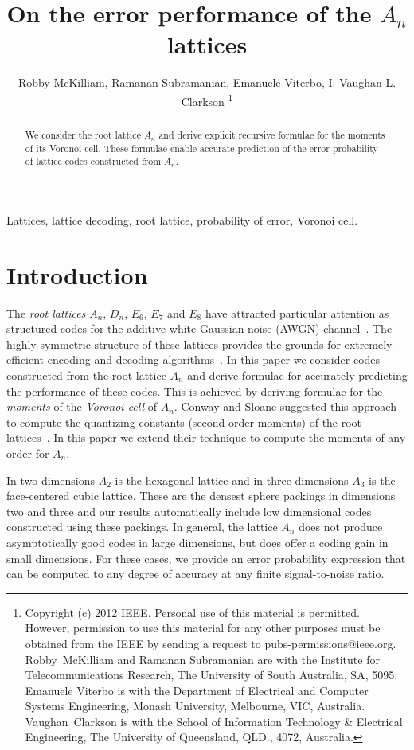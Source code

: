 \documentclass[journal]{IEEEtran}
\title{On the error performance of the $A_n$ lattices}
\author{Robby McKilliam, Ramanan Subramanian, Emanuele Viterbo, I. Vaughan L. Clarkson
 \thanks{Copyright (c) 2012 IEEE. Personal use of this material is permitted.  However, permission to use this material for any other purposes must be obtained from the IEEE by sending a request to pubs-permissions@ieee.org.  Robby~McKilliam and Ramanan Subramanian are with the Institute for Telecommunications Research, The University of South Australia, SA, 5095.  Emanuele Viterbo is with the Department of Electrical and Computer Systems Engineering, Monash University, Melbourne, VIC, Australia.   Vaughan~Clarkson is with the School of Information Technology \& Electrical Engineering, The University of Queensland, QLD., 4072, Australia.}
}
\begin{document}
\newcommand{\calR}{\mathcal{R}}
\newcommand{\hist}{\operatorname{hist}}

\maketitle

\begin{abstract}
We consider the root lattice $A_n$ and derive explicit recursive formulae for the moments of its Voronoi cell.  These formulae
enable accurate prediction of the error probability of lattice codes constructed from $A_n$.
\end{abstract}

\begin{IEEEkeywords}
Lattices, lattice decoding, root lattice, probability of error, Voronoi cell.
\end{IEEEkeywords}

\section{Introduction}\label{sec:introduction}


The \emph{root lattices} $A_n$, $D_n$, $E_6$, $E_7$ and $E_8$ have attracted particular attention as structured codes for the additive white Gaussian noise (AWGN) channel~\cite{SPLAG}. The highly symmetric structure of these lattices provides the grounds for extremely efficient encoding and decoding algorithms~\cite{Conway1982FastQuantDec,McKilliam2009CoxeterLattices,McKilliam2008}.  In this paper we consider codes constructed from the root lattice $A_n$ and derive formulae for accurately predicting the performance of these codes.  This is achieved by deriving formulae for the \emph{moments} of the \emph{Voronoi cell} of $A_n$.  Conway and Sloane suggested this approach to compute the quantizing constants (second order moments) of the root lattices~\cite{Conway1982VoronoiRegions}.  In this paper we extend their technique to compute the moments of any order for $A_n$.

In two dimensions $A_2$ is the hexagonal lattice and in three dimensions $A_3$ is the face-centered cubic lattice.  These are the densest sphere packings in dimensions two and three and our results automatically include low dimensional codes constructed using these packings.  In general, the lattice $A_n$ does not produce asymptotically good codes in large dimensions, but does offer a coding gain in small dimensions.  For these cases, we provide an error probability expression that can be computed to any degree of accuracy at any finite signal-to-noise ratio.
\end{document}
